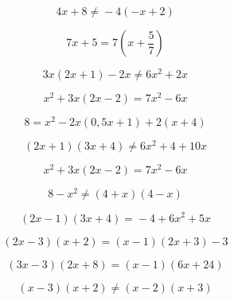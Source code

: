 
\begin{multicols}{3}
     $$4x+8 \boldsymbol{\neq} -4(-x+2)$$

     $$7x+5 \boldsymbol{=} 7\left(x+\frac{5}{7}\right)$$

     $$3x(2x+1) -2x \boldsymbol{\neq} 6x^2+2x$$

     $$x^2+3x(2x-2) \boldsymbol{=} 7x^2-6x$$ 

     $$8 \boldsymbol{=} x^2-2x(0,5x+1)+2(x+4)$$ 


     $$(2x+1)(3x+4) \boldsymbol{\neq} 6x^2+4+10x$$ 

     $$x^2+3x(2x-2) \boldsymbol{=} 7x^2-6x$$ 

     $$8 -x^2 \boldsymbol{\neq}(4+x)(4-x)$$


     $$(2x-1)(3x+4) \boldsymbol{=} -4+6x^2+5x$$ 

     $$(2x-3)(x+2) \boldsymbol{=} (x-1)(2x+3)-3$$ 

     $$(3x-3)(2x+8) \boldsymbol{=} (x-1)(6x+24)$$


     $$(x-3)(x+2) \boldsymbol{\neq} (x-2)(x+3)$$ 
\end{multicols}